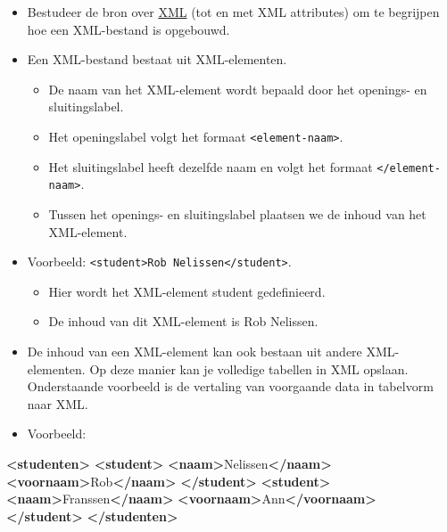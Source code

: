 \documentclass[]{memoir}
\newenvironment{Shaded}{\begin{snugshade}}{\end{snugshade}}
\newcommand{\KeywordTok}[1]{\textcolor[rgb]{0.13,0.29,0.53}{\textbf{#1}}}
\newcommand{\NormalTok}[1]{#1}
\providecommand{\tightlist}{%
  \setlength{\itemsep}{0pt}\setlength{\parskip}{0pt}}
\begin{document}
\begin{itemize}
\tightlist
\item
  Bestudeer de bron over \href{https://www.w3schools.com/xml/default.asp}{XML} (tot en met XML attributes) om te begrijpen hoe een XML-bestand is opgebouwd.
\item
  Een XML-bestand bestaat uit XML-elementen.

  \begin{itemize}
  \tightlist
  \item
    De naam van het XML-element wordt bepaald door het openings- en sluitingslabel.
  \item
    Het openingslabel volgt het formaat \texttt{\textless{}element-naam\textgreater{}}.
  \item
    Het sluitingslabel heeft dezelfde naam en volgt het formaat \texttt{\textless{}/element-naam\textgreater{}}.
  \item
    Tussen het openings- en sluitingslabel plaatsen we de inhoud van het XML-element.
  \end{itemize}
\item
  Voorbeeld: \texttt{\textless{}student\textgreater{}Rob\ Nelissen\textless{}/student\textgreater{}}.

  \begin{itemize}
  \tightlist
  \item
    Hier wordt het XML-element student gedefinieerd.
  \item
    De inhoud van dit XML-element is Rob Nelissen.
  \end{itemize}
\item
  De inhoud van een XML-element kan ook bestaan uit andere XML-elementen. Op deze manier kan je volledige tabellen in XML opslaan. Onderstaande voorbeeld is de vertaling van voorgaande data in tabelvorm naar XML.
\item
  Voorbeeld:
\end{itemize}

\begin{Shaded}
\begin{Highlighting}[]
\KeywordTok{<studenten>}
  \KeywordTok{<student>}
    \KeywordTok{<naam>}\NormalTok{Nelissen}\KeywordTok{</naam>}
    \KeywordTok{<voornaam>}\NormalTok{Rob}\KeywordTok{</naam>}
  \KeywordTok{</student>}
  \KeywordTok{<student>}
    \KeywordTok{<naam>}\NormalTok{Franssen}\KeywordTok{</naam>}
    \KeywordTok{<voornaam>}\NormalTok{Ann}\KeywordTok{</voornaam>}
  \KeywordTok{</student>}
\KeywordTok{</studenten>}
\end{Highlighting}
\end{Shaded}
\end{document}
